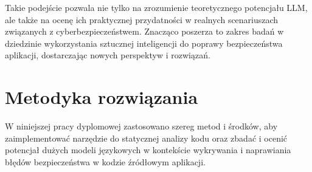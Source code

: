 Takie podejście pozwala nie tylko na zrozumienie teoretycznego potencjału LLM, ale także na ocenę ich praktycznej przydatności w realnych scenariuszach związanych z cyberbezpieczeństwem. Znacząco poszerza to zakres badań w dziedzinie wykorzystania sztucznej inteligencji do poprawy bezpieczeństwa aplikacji, dostarczając nowych perspektyw i rozwiązań.

\chapter{Metodyka rozwiązania}

W niniejszej pracy dyplomowej zastosowano szereg metod i środków, aby zaimplementować narzędzie do statycznej analizy kodu oraz zbadać i ocenić potencjał dużych modeli językowych w kontekście wykrywania i naprawiania błędów bezpieczeństwa w kodzie źródłowym aplikacji.

